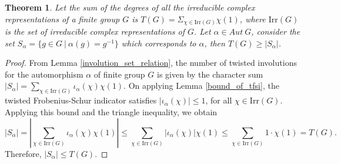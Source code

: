 \documentclass[oneside]{amsart}
\theoremstyle{plain}
\newtheorem{theorem}{Theorem}[section] %
\theoremstyle{definition}
\theoremstyle{remark}
\begin{document}
    
    \begin{theorem}\label{half_main_result}
         Let the sum of the degrees of all the irreducible complex representations of a finite group $G$ is $T(G) = \Sigma_{\chi \in \mathrm{Irr}(G)}\chi(1)$, where $\mathrm{Irr}(G)$ is the set of irreducible complex representations of  $G$. Let $\alpha\in Aut \ G $, consider the set $S_{\alpha} = \{g \in G \ | \ \alpha(g) = g^{-1}\}$ which corresponds to $\alpha$, then $T(G) \geq |S_{\alpha}|$.
    \end{theorem}
    \begin{proof}
        From Lemma \ref{involution_set_relation}, the number of twisted involutions for the automorphism $\alpha$ of finite group $G$ is given by the character sum $|S_{\alpha}| = \sum_{\chi \in \mathrm{Irr}(G)} \iota_{\alpha}(\chi) \chi(1)$.
        On applying Lemma \ref{bound_of_tfsi}, the twisted Frobenius-Schur indicator satisfies $|\iota_{\alpha}(\chi)| \leq 1$, for all $\chi \in \mathrm{Irr}(G)$. Applying this bound and the triangle inequality, we obtain
        \begin{equation}
        |S_{\alpha}| = \left| \sum_{\chi \in \mathrm{Irr}(G)} \iota_{\alpha}(\chi) \chi(1) \right| \leq \sum_{\chi \in \mathrm{Irr}(G)} |\iota_{\alpha}(\chi)| \chi(1) \leq \sum_{\chi \in \mathrm{Irr}(G)} 1 \cdot \chi(1) = T(G).
        \end{equation}
        Therefore, $|S_{\alpha}| \leq T(G)$.
    \end{proof}
\end{document}
